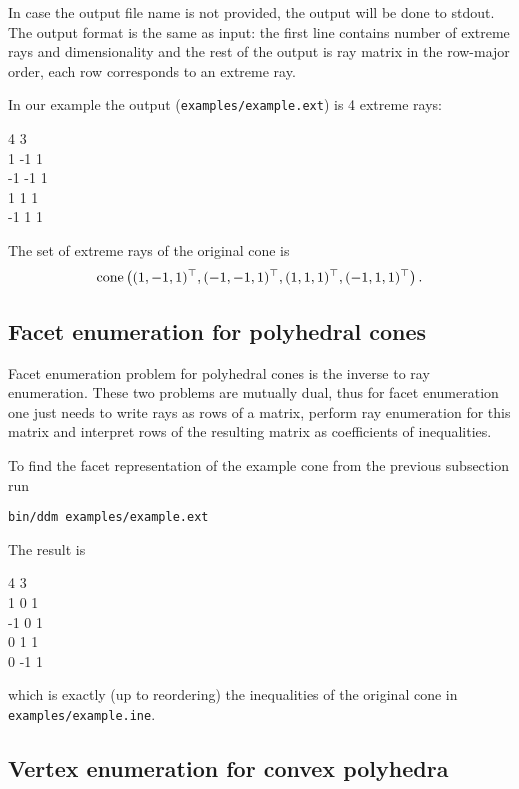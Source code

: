 \documentclass{article}
\newcommand{\cone}[1]{\mathop{\rm cone} \left( #1 \right)}
\newcommand{\transpose}{^{\top}}
\begin{document}
In case the output file name is not provided, the output will be done to stdout. The output format is the same as input: the first line contains number of extreme rays and dimensionality and the rest of the output is ray matrix in the row-major order, each row corresponds to an extreme ray. 

In our example the output (\verb$examples/example.ext$) is 4 extreme rays:
\begin{adjustwidth}{5cm}{0pt}
4 3 \\
1 -1 1 \\
-1 -1 1 \\
1 1 1 \\
-1 1 1
\end{adjustwidth}

The set of extreme rays of the original cone is
$$\cone{(1, -1, 1)\transpose, (-1, -1, 1)\transpose, (1, 1, 1)\transpose, (-1, 1, 1)\transpose}.
$$

\subsection{Facet enumeration for polyhedral cones}\label{sec_FacetEnumeration}

Facet enumeration problem for polyhedral cones is the inverse to ray enumeration. These two problems are mutually dual, thus for facet enumeration one just needs to write rays as rows of a matrix, perform ray enumeration for this matrix and interpret rows of the resulting matrix as coefficients of inequalities.

To find the facet representation of the example cone from the previous subsection run
\begin{verbatim}
bin/ddm examples/example.ext
\end{verbatim}

The result is
\begin{adjustwidth}{5cm}{0pt}
4 3 \\
1 0 1 \\
-1 0 1 \\
0 1 1 \\
0 -1 1
\end{adjustwidth}
which is exactly (up to reordering) the inequalities of the original cone in \verb$examples/example.ine$.

\subsection{Vertex enumeration for convex polyhedra}\label{sec_PolyhedraVertexEnumeration}
\end{document}
